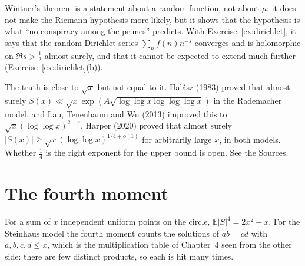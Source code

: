 Wintner's theorem is a statement about a random function, not about $\mu$: it does not make the Riemann hypothesis more likely, but it shows that the hypothesis is what ``no conspiracy among the primes'' predicts. With Exercise~\ref{ex:dirichlet}, it says that the random Dirichlet series $\sum_nf(n)n^{-s}$ converges and is holomorphic on $\Re s>\frac12$ almost surely, and that it cannot be expected to extend much further (Exercise~\ref{ex:dirichlet}(b)).

\begin{remark}
The truth is close to $\sqrt x$ but not equal to it. Halász (1983) proved that almost surely $S(x)\ll\sqrt x\exp(A\sqrt{\log\log x\log\log\log x})$ in the Rademacher model, and Lau, Tenenbaum and Wu (2013) improved this to $\sqrt x(\log\log x)^{2+\varepsilon}$. Harper (2020) proved that almost surely $|S(x)|\ge\sqrt x(\log\log x)^{1/4+o(1)}$ for arbitrarily large $x$, in both models. Whether $\frac14$ is the right exponent for the upper bound is open. See the Sources.
\end{remark}

\section{The fourth moment}

For a sum of $x$ independent uniform points on the circle, $\mathbb E|S|^4=2x^2-x$. For the Steinhaus model the fourth moment counts the solutions of $ab=cd$ with $a,b,c,d\le x$, which is the multiplication table of Chapter~4 seen from the other side: there are few distinct products, so each is hit many times.


